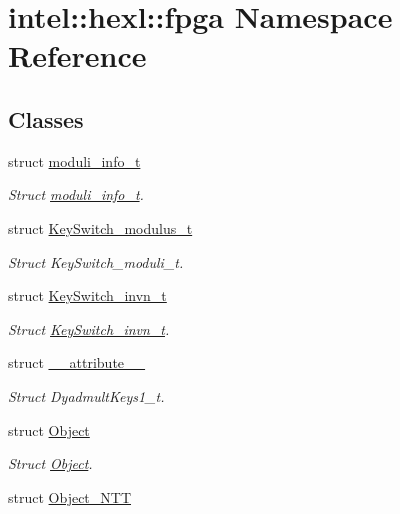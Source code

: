 \hypertarget{namespaceintel_1_1hexl_1_1fpga}{\section{intel\-:\-:hexl\-:\-:fpga Namespace Reference}
\label{namespaceintel_1_1hexl_1_1fpga}
}
\subsection*{Classes}
\begin{DoxyCompactItemize}
\item 
struct \hyperlink{structintel_1_1hexl_1_1fpga_1_1moduli__info__t}{moduli\-\_\-info\-\_\-t}
\begin{DoxyCompactList}\small\item\em Struct \hyperlink{structintel_1_1hexl_1_1fpga_1_1moduli__info__t}{moduli\-\_\-info\-\_\-t}. \end{DoxyCompactList}\item 
struct \hyperlink{structintel_1_1hexl_1_1fpga_1_1KeySwitch__modulus__t}{Key\-Switch\-\_\-modulus\-\_\-t}
\begin{DoxyCompactList}\small\item\em Struct Key\-Switch\-\_\-moduli\-\_\-t. \end{DoxyCompactList}\item 
struct \hyperlink{structintel_1_1hexl_1_1fpga_1_1KeySwitch__invn__t}{Key\-Switch\-\_\-invn\-\_\-t}
\begin{DoxyCompactList}\small\item\em Struct \hyperlink{structintel_1_1hexl_1_1fpga_1_1KeySwitch__invn__t}{Key\-Switch\-\_\-invn\-\_\-t}. \end{DoxyCompactList}\item 
struct \hyperlink{structintel_1_1hexl_1_1fpga_1_1____attribute____}{\-\_\-\-\_\-attribute\-\_\-\-\_\-}
\begin{DoxyCompactList}\small\item\em Struct Dyadmult\-Keys1\-\_\-t. \end{DoxyCompactList}\item 
struct \hyperlink{structintel_1_1hexl_1_1fpga_1_1Object}{Object}
\begin{DoxyCompactList}\small\item\em Struct \hyperlink{structintel_1_1hexl_1_1fpga_1_1Object}{Object}. \end{DoxyCompactList}\item 
struct \hyperlink{structintel_1_1hexl_1_1fpga_1_1Object__NTT}{Object\-\_\-\-N\-T\-T}

\end{DoxyCompactItemize}

